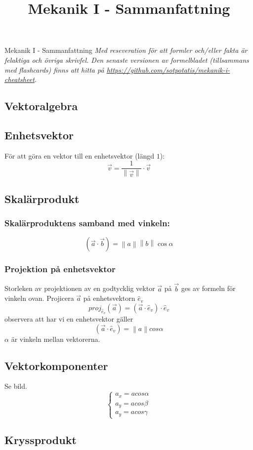 \documentclass{article}
\title{Mekanik I - Sammanfattning}
\date{}
\newcommand{\midtitle}[1]{
\begin{center}
\Huge{\text{#1}}
\newpage
\end{center}
}
\begin{document}
\Huge{Mekanik I - Sammanfattning}
\normalsize\newline
\textit{Med reseveration för att formler och/eller fakta är felaktiga och övriga skrivfel. Den senaste versionen av formelbladet (tillsammans med flashcards) finns att hitta på \url{https://github.com/sotpotatis/mekanik-i-cheatsheet}.}
\newpage
\midtitle{Statik}
\begin{paracol}{2}
\section{Vektoralgebra}
\subsection{Enhetsvektor}
För att göra en vektor till en enhetsvektor (längd $1$):
$$
\boxed{
\vec v = \frac{1}{\left\| \vec v \right\|} \cdot \vec v
}
$$
\subsection{Skalärprodukt}
\subsubsection{Skalärproduktens samband med vinkeln:}
$$
\boxed{
(\vec a \cdot \vec b)=\left\|a\right\|\left\|b\right\|\cos\alpha
}
$$
\subsubsection{Projektion på enhetsvektor}
Storleken av projektionen av en godtycklig vektor $\vec a$ på $\vec b$ ges av formeln för vinkeln ovan.
Projicera $\vec a$ på enhetsvektorn $\hat e_v$ 
$$
proj_{\hat e_v}(\vec a)=(\vec a \cdot \hat e_v)\cdot \hat e_v
$$
observera att har vi en enhetsvektor gäller
$$
(\vec a \cdot \hat e_v)=\left\|a\right\|cos\alpha
$$
$\alpha$ är vinkeln mellan vektorerna.

\subsection{Vektorkomponenter}
Se bild.
$$
\begin{cases}
a_x = acos\alpha\\
a_y = acos\beta\\
a_y = acos\gamma
\end{cases}
$$
\subsection{Kryssprodukt}

\end{paracol}
\end{document}

